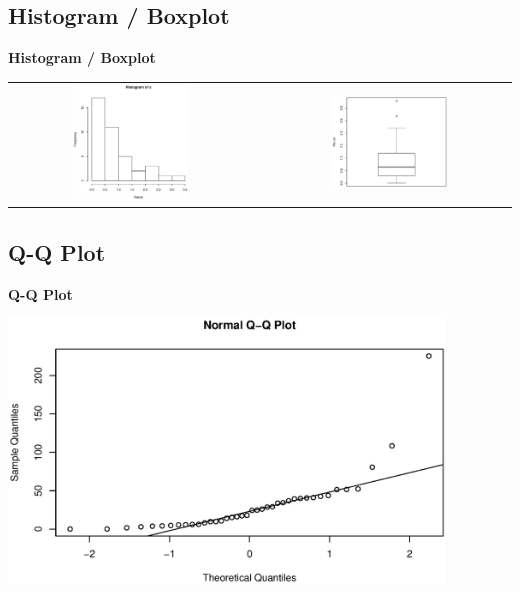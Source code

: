 \documentclass[compress]{beamer}        %
\makeatletter
\newcommand{\tcb}{\textcolor{beamer@blendedblue}}
\makeatother
\begin{document}
\subsection{Histogram / Boxplot}
\begin{frame}{\bf \tcb{Histogram / Boxplot}}
\begin{adjustwidth}{-0.2cm}{}
\begin{tabular}{c@{}c@{}c}
\includegraphics[width=0.5\textwidth, trim = 0.0cm 0.5cm 0.3cm 0.5cm, clip]{HistExp}
&&
\includegraphics[width=0.5\textwidth, trim = 0.0cm 0.5cm 0.3cm 0.5cm, clip]{BoxplotExp}
\end{tabular}
\end{adjustwidth}

\end{frame}


\subsection{Q-Q Plot}
\begin{frame}{\bf \tcb{Q-Q Plot}\\[-1.1cm]}
\begin{center}
\includegraphics[width=0.87\textwidth, trim = 0.0cm 0.5cm 0.3cm 0.5cm, clip]{QQExp}
\end{center}

\end{frame}
\end{document}

